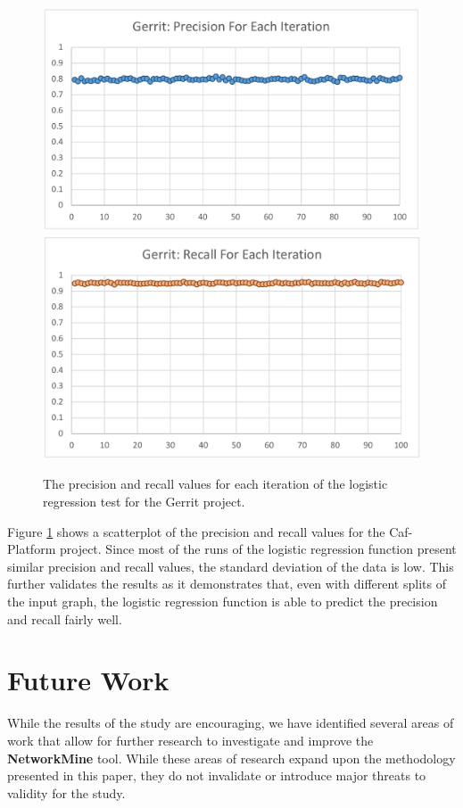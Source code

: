 \documentclass{sig-alternate-05-2015}
\begin{document}
\begin{figure}
\centering
\vspace*{-3mm}
\includegraphics[scale=0.35]{gerrit_precision}
\includegraphics[scale=0.35]{gerrit_recall}
\caption{The precision and recall values for each iteration of the 
logistic regression test for the Gerrit project.}
\label{graph:prec_rec}
\vspace*{-3mm}
\end{figure}

Figure \ref{graph:prec_rec} shows a scatterplot of the precision and recall values for the Caf-Platform project. Since most of the runs of the logistic regression function present similar precision and recall values, the standard deviation of the data is low. This further validates the results as it demonstrates that, even with different splits of the input graph, the logistic regression function is able to predict the precision and recall fairly well.

\section{Future Work}
\label{future_work}
While the results of the study are encouraging, we have identified several areas of work that allow for further research to investigate and improve the \textbf{NetworkMine} tool. While these areas of research expand upon the methodology presented in this paper, they do not invalidate or introduce major threats to validity for the study.
\end{document}
